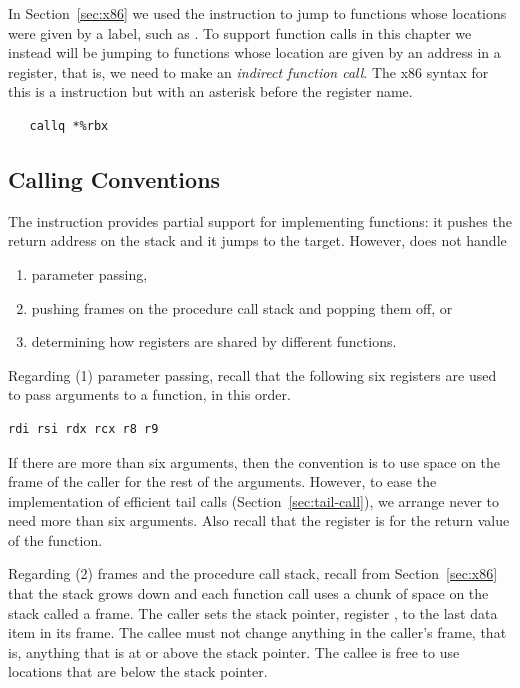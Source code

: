 \documentclass[7x10]{TimesAPriori_MIT}%
\begin{document}
In Section~\ref{sec:x86} we used the  instruction to jump
to functions whose locations were given by a label, such as
. To support function calls in this chapter we instead
will be jumping to functions whose location are given by an address in
a register, that is, we need to make an \emph{indirect function
call}. The x86 syntax for this is a  instruction but with
an asterisk before the register name.
\begin{lstlisting}
   callq *%rbx
\end{lstlisting}


\subsection{Calling Conventions}


The  instruction provides partial support for implementing
functions: it pushes the return address on the stack and it jumps to
the target. However,  does not handle
\begin{enumerate}
\item parameter passing,
\item pushing frames on the procedure call stack and popping them off,
  or
\item determining how registers are shared by different functions.
\end{enumerate}

Regarding (1) parameter passing, recall that the following six
registers are used to pass arguments to a function, in this order.
\begin{lstlisting}
rdi rsi rdx rcx r8 r9
\end{lstlisting}
If there are
more than six arguments, then the convention is to use space on the
frame of the caller for the rest of the arguments. However, to ease
the implementation of efficient tail calls
(Section~\ref{sec:tail-call}), we arrange never to need more than six
arguments.
%
Also recall that the register  is for the return value of
the function.


Regarding (2) frames  and the procedure call
stack,  recall from
Section~\ref{sec:x86} that the stack grows down and each function call
uses a chunk of space on the stack called a frame. The caller sets the
stack pointer, register , to the last data item in its
frame. The callee must not change anything in the caller's frame, that
is, anything that is at or above the stack pointer. The callee is free
to use locations that are below the stack pointer.
\end{document}
